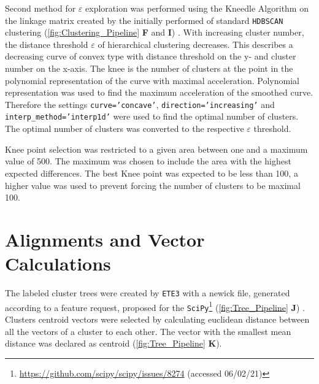 \vspace{1em}

Second method for $\varepsilon$ exploration was performed using the Kneedle Algorithm on the linkage matrix created by the initially performed of standard \texttt{HDBSCAN} clustering (\autoref{fig:Clustering_Pipeline} \textsf{\textbf{F}} and \textsf{\textbf{I}}) \autocite{satopaa_finding_2011}. With increasing cluster number, the distance threshold $\varepsilon$ of hierarchical clustering decreases. This describes a decreasing curve of convex type with distance threshold on the y- and cluster number on the x-axis. The knee is the number of clusters at the point in the polynomial representation of the curve with maximal acceleration. Polynomial representation was used to find the maximum acceleration of the smoothed curve. Therefore the settings \texttt{curve='concave'}, \texttt{direction='increasing'} and \texttt{interp\_method='interp1d'} were used to find the optimal number of clusters. The optimal number of clusters was converted to the respective $\varepsilon$ threshold.

\vspace{1em}

Knee point selection was restricted to a given area between one and a maximum value of 500. The maximum was chosen to include the area with the highest expected differences. The best Knee point was expected to be less than 100, a higher value was used to prevent forcing the number of clusters to be maximal 100. 

\section{Alignments and Vector Calculations} \label{sec:MAFFT}

The labeled cluster trees were created by \texttt{ETE3} with a newick file, generated according to a feature request, proposed for the \texttt{SciPy}\footnote{\url{https://github.com/scipy/scipy/issues/8274} (accessed 06/02/21)} (\autoref{fig:Tree_Pipeline} \textsf{\textbf{J}}) \autocite{huerta-cepas_ete_2016}. Clusters centroid vectors were selected by calculating euclidean distance between all the vectors of a cluster to each other. The vector with the smallest mean distance was declared as centroid (\autoref{fig:Tree_Pipeline} \textsf{\textbf{K}}). 


